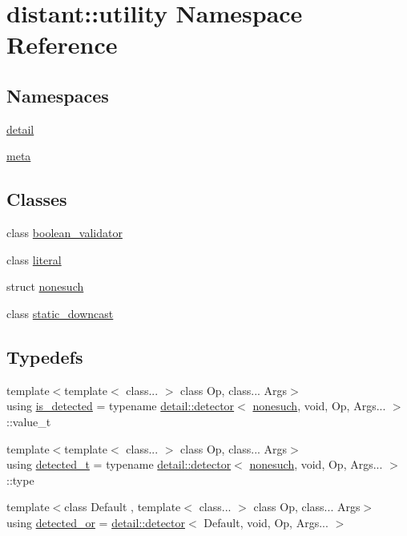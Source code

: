 \hypertarget{namespacedistant_1_1utility}{}\section{distant\+:\+:utility Namespace Reference}
\label{namespacedistant_1_1utility}
\subsection*{Namespaces}
\begin{DoxyCompactItemize}
\item 
 \mbox{\hyperlink{namespacedistant_1_1utility_1_1detail}{detail}}
\item 
 \mbox{\hyperlink{namespacedistant_1_1utility_1_1meta}{meta}}
\end{DoxyCompactItemize}
\subsection*{Classes}
\begin{DoxyCompactItemize}
\item 
class \mbox{\hyperlink{classdistant_1_1utility_1_1boolean__validator}{boolean\+\_\+validator}}
\item 
class \mbox{\hyperlink{classdistant_1_1utility_1_1literal}{literal}}
\item 
struct \mbox{\hyperlink{structdistant_1_1utility_1_1nonesuch}{nonesuch}}
\item 
class \mbox{\hyperlink{classdistant_1_1utility_1_1static__downcast}{static\+\_\+downcast}}
\end{DoxyCompactItemize}
\subsection*{Typedefs}
\begin{DoxyCompactItemize}
\item 
{\footnotesize template$<$template$<$ class... $>$ class Op, class... Args$>$ }\\using \mbox{\hyperlink{namespacedistant_1_1utility_a640a6ceaf01c2de65e74899153c1b55a}{is\+\_\+detected}} = typename \mbox{\hyperlink{structdistant_1_1utility_1_1detail_1_1detector}{detail\+::detector}}$<$ \mbox{\hyperlink{structdistant_1_1utility_1_1nonesuch}{nonesuch}}, void, Op, Args... $>$\+::value\+\_\+t
\item 
{\footnotesize template$<$template$<$ class... $>$ class Op, class... Args$>$ }\\using \mbox{\hyperlink{namespacedistant_1_1utility_af5141f95b7f0dde0fff6a3642f3bf2ee}{detected\+\_\+t}} = typename \mbox{\hyperlink{structdistant_1_1utility_1_1detail_1_1detector}{detail\+::detector}}$<$ \mbox{\hyperlink{structdistant_1_1utility_1_1nonesuch}{nonesuch}}, void, Op, Args... $>$\+::type
\item 
{\footnotesize template$<$class Default , template$<$ class... $>$ class Op, class... Args$>$ }\\using \mbox{\hyperlink{namespacedistant_1_1utility_a8f1f936c7b4ff942d6fd06522f95008a}{detected\+\_\+or}} = \mbox{\hyperlink{structdistant_1_1utility_1_1detail_1_1detector}{detail\+::detector}}$<$ Default, void, Op, Args... $>$
\end{DoxyCompactItemize}
